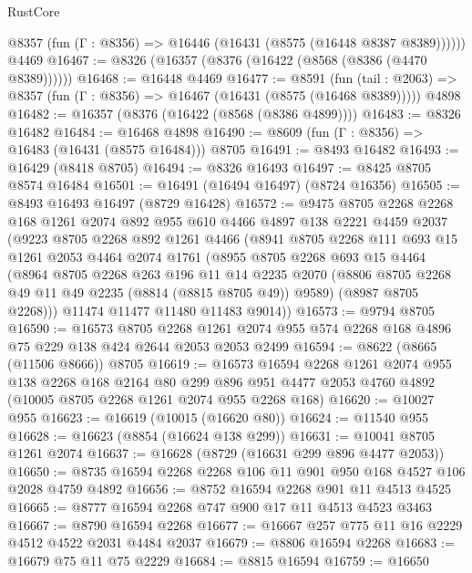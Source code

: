 \begin{lexlean}{RustCore}
\begin{coremodule}
      @8357 (fun (Γ : @8356) => @16446 (@16431 (@8575 (@16448 @8387 @8389))))))
    @4469
@16467 := @8326 (@16357 (@8376 (@16422 (@8568 (@8386 (@4470 @8389))))))
@16468 := @16448 @4469
@16477 := @8591
    (fun (tail : @2063) => @8357 (fun (Γ : @8356) => @16467 (@16431 (@8575 (@16468 @8389)))))
    @4898
@16482 := @16357 (@8376 (@16422 (@8568 (@8386 @4899))))
@16483 := @8326 @16482
@16484 := @16468 @4898
@16490 := @8609 (fun (Γ : @8356) => @16483 (@16431 (@8575 @16484))) @8705
@16491 := @8493 @16482
@16493 := @16429 (@8418 @8705)
@16494 := @8326 @16493
@16497 := @8425 @8705 @8574 @16484
@16501 := @16491 (@16494 @16497) (@8724 @16356)
@16505 := @8493 @16493 @16497 (@8729 @16428)
@16572 := @9475
    @8705
    @2268
    @2268
    @168
    @1261
    @2074
    @892
    @955
    @610
    @4466
    @4897
    @138
    @2221
    @4459
    @2037
    (@9223
      @8705
      @2268
      @892
      @1261
      @4466
      (@8941
        @8705
        @2268
        @111
        @693
        @15
        @1261
        @2053
        @4464
        @2074
        @1761
        (@8955
          @8705
          @2268
          @693
          @15
          @4464
          (@8964
            @8705
            @2268
            @263
            @196
            @11
            @14
            @2235
            @2070
            (@8806 @8705 @2268 @49 @11 @49 @2235 (@8814 (@8815 @8705 @49)) @9589)
            (@8987 @8705 @2268)))
        @11474
        @11477
        @11480
        @11483
        @9014))
@16573 := @9794 @8705
@16590 := @16573
    @8705
    @2268
    @1261
    @2074
    @955
    @574
    @2268
    @168
    @4896
    @75
    @229
    @138
    @424
    @2644
    @2053
    @2053
    @2499
@16594 := @8622 (@8665 (@11506 @8666)) @8705
@16619 := @16573
    @16594
    @2268
    @1261
    @2074
    @955
    @138
    @2268
    @168
    @2164
    @80
    @299
    @896
    @951
    @4477
    @2053
    @4760
    @4892
    (@10005 @8705 @2268 @1261 @2074 @955 @2268 @168)
@16620 := @10027 @955
@16623 := @16619 (@10015 (@16620 @80))
@16624 := @11540 @955
@16628 := @16623 (@8854 (@16624 @138 @299))
@16631 := @10041 @8705 @1261 @2074
@16637 := @16628 (@8729 (@16631 @299 @896 @4477 @2053))
@16650 := @8735 @16594 @2268 @2268 @106 @11 @901 @950 @168 @4527 @106 @2028 @4759 @4892
@16656 := @8752 @16594 @2268 @901 @11 @4513 @4525
@16665 := @8777 @16594 @2268 @747 @900 @17 @11 @4513 @4523 @3463
@16667 := @8790 @16594 @2268
@16677 := @16667 @257 @775 @11 @16 @2229 @4512 @4522 @2031 @4484 @2037
@16679 := @8806 @16594 @2268
@16683 := @16679 @75 @11 @75 @2229
@16684 := @8815 @16594
@16759 := @16650

\end{coremodule}
\end{lexlean}
